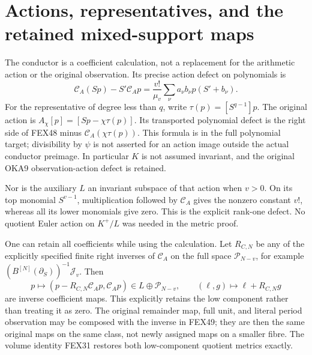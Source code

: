 \documentclass[11pt,a4paper]{article}
\begin{document}
\section{Actions, representatives, and the retained mixed-support maps}
\label{sec:FEX-maps}
The conductor is a coefficient calculation, not a replacement for the
arithmetic action or the original observation. Its precise action defect
on polynomials is
\[
 \mathcal C_A(Sp)-S'\mathcal C_Ap
       =\frac{v!}{\mu_v}\sum_\nu a_\nu b_\nu p(S'+b_\nu).
 \tag{FEX48}
\]
For the representative of degree less than $q$, write
$\tau(p)=[S^{q-1}]p$. The original action is
$A_\chi[p]=[Sp-\chi\tau(p)]$. Its transported polynomial defect is the
right side of FEX48 minus $\mathcal C_A(\chi\tau(p))$. This formula is
in the full polynomial target; divisibility by $\psi$ is not asserted
for an action image outside the actual conductor preimage. In
particular $K$ is not assumed invariant, and the original OKA9
observation-action defect is retained.

Nor is the auxiliary $L$ an invariant subspace of that action when
$v>0$. On its top monomial $S^{v-1}$, multiplication followed by
$\mathcal C_A$ gives the nonzero constant $v!$, whereas all its lower
monomials give zero. This is the explicit rank-one defect. No quotient
Euler action on $K^+/L$ was needed in the metric proof.

One can retain all coefficients while using the calculation. Let
$R_{C,N}$ be any of the explicitly specified finite right inverses of
$\mathcal C_A$ on the full space $\mathcal P_{N-v}$, for example
$(B^{[N]}(\partial_S))^{-1}\mathcal J_v$. Then
\[
 p\longmapsto(p-R_{C,N}\mathcal C_Ap,\mathcal C_Ap)
       \in L\oplus\mathcal P_{N-v},\qquad
 (\ell,g)\longmapsto\ell+R_{C,N}g
 \tag{FEX49}
\]
are inverse coefficient maps. This explicitly retains the low
component rather than treating it as zero. The original remainder map,
full unit, and literal period observation may be composed with the
inverse in FEX49; they are then the same original maps on the same
class, not newly assigned maps on a smaller fibre. The volume identity
FEX31 restores both low-component quotient metrics exactly.
\end{document}
